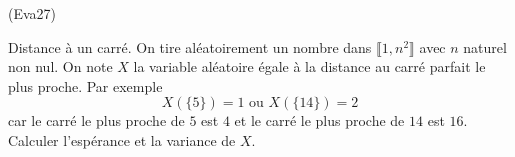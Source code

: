\begin{tiny}(Eva27) \end{tiny}Distance à un carré.\newline
On tire aléatoirement un nombre dans $\llbracket 1, n^2 \rrbracket$ avec $n$ naturel non nul. On note $X$ la variable aléatoire égale à la distance au carré parfait le plus proche. Par exemple
\begin{displaymath}
  X(\{5\}) = 1 \text{ ou } X(\{14\}) = 2
\end{displaymath}
car le carré le plus proche de $5$ est $4$ et le carré le plus proche de $14$ est $16$.\newline
Calculer l'espérance et la variance de $X$.
